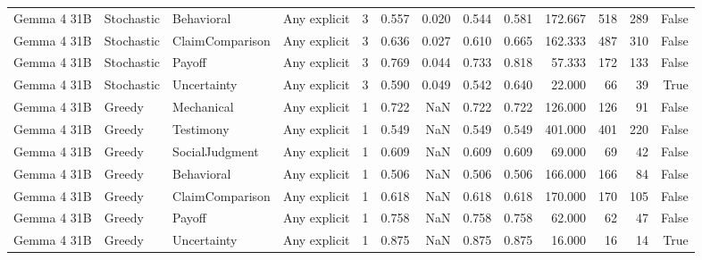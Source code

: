 \begin{tabular}{llllrrrrrrrrr}
Gemma 4 31B & Stochastic & Behavioral & Any explicit & 3 & 0.557 & 0.020 & 0.544 & 0.581 & 172.667 & 518 & 289 & False \\
Gemma 4 31B & Stochastic & ClaimComparison & Any explicit & 3 & 0.636 & 0.027 & 0.610 & 0.665 & 162.333 & 487 & 310 & False \\
Gemma 4 31B & Stochastic & Payoff & Any explicit & 3 & 0.769 & 0.044 & 0.733 & 0.818 & 57.333 & 172 & 133 & False \\
Gemma 4 31B & Stochastic & Uncertainty & Any explicit & 3 & 0.590 & 0.049 & 0.542 & 0.640 & 22.000 & 66 & 39 & True \\
Gemma 4 31B & Greedy & Mechanical & Any explicit & 1 & 0.722 & NaN & 0.722 & 0.722 & 126.000 & 126 & 91 & False \\
Gemma 4 31B & Greedy & Testimony & Any explicit & 1 & 0.549 & NaN & 0.549 & 0.549 & 401.000 & 401 & 220 & False \\
Gemma 4 31B & Greedy & SocialJudgment & Any explicit & 1 & 0.609 & NaN & 0.609 & 0.609 & 69.000 & 69 & 42 & False \\
Gemma 4 31B & Greedy & Behavioral & Any explicit & 1 & 0.506 & NaN & 0.506 & 0.506 & 166.000 & 166 & 84 & False \\
Gemma 4 31B & Greedy & ClaimComparison & Any explicit & 1 & 0.618 & NaN & 0.618 & 0.618 & 170.000 & 170 & 105 & False \\
Gemma 4 31B & Greedy & Payoff & Any explicit & 1 & 0.758 & NaN & 0.758 & 0.758 & 62.000 & 62 & 47 & False \\
Gemma 4 31B & Greedy & Uncertainty & Any explicit & 1 & 0.875 & NaN & 0.875 & 0.875 & 16.000 & 16 & 14 & True \\
\bottomrule
\end{tabular}
